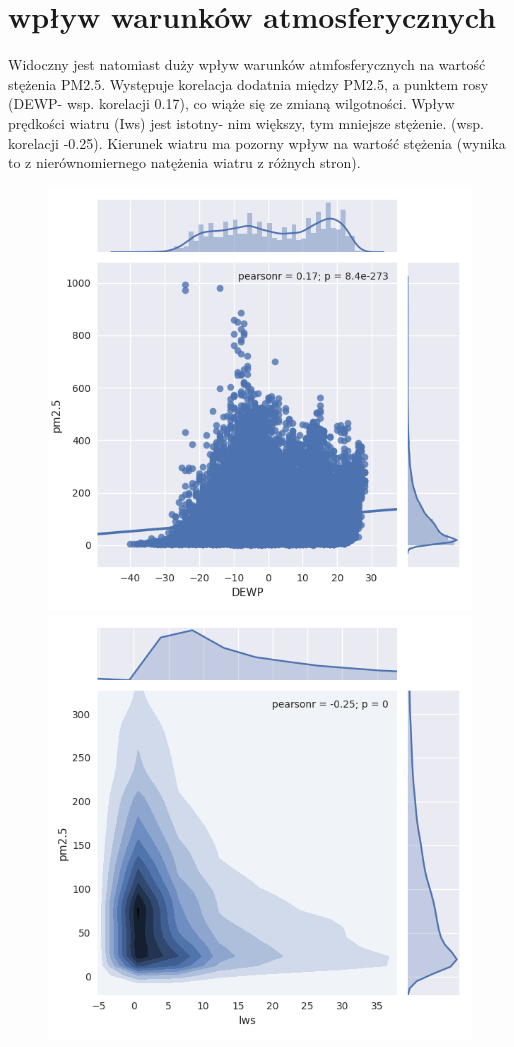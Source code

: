 \documentclass{beamer}
\begin{document}
\section{wpływ warunków atmosferycznych}
\begin{frame}
	Widoczny jest natomiast duży wpływ warunków atmfosferycznych na wartość stężenia PM2.5. Występuje korelacja dodatnia między PM2.5, a punktem rosy (DEWP- wsp. korelacji 0.17),
	co wiąże się ze zmianą wilgotności. Wpływ prędkości wiatru (Iws) jest istotny- nim większy, tym mniejsze stężenie. (wsp. korelacji -0.25). Kierunek wiatru ma pozorny wpływ na wartość stężenia (wynika to z nierównomiernego natężenia wiatru z różnych stron).
	\begin{figure}
		\centering
		\begin{minipage}{.5\textwidth}
			\centering
			\includegraphics[width=0.7\linewidth]{dewp}
		\end{minipage}%
		\begin{minipage}{.5\textwidth}
			\centering
			\includegraphics[width=0.7\linewidth]{Iws}
		\end{minipage}
	\end{figure}

\end{frame}
\end{document}
